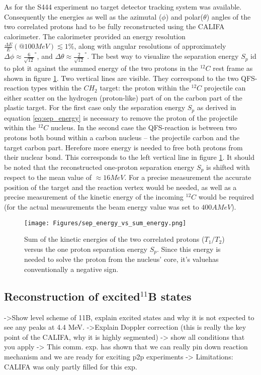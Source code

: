 As for the S444 experiment no target detector tracking system was available. Consequently the energies as well as the azimutal ($\phi$) and polar($\theta$) angles of the two correlated protons had to be fully reconstructed using the CALIFA calorimeter. The calorimeter provided an energy resolution $\frac{\Delta E}{E}(@100MeV) \lesssim 1 \%$, along with angular resolutions of approximately  $\Delta \phi \approx \frac{6}{\sqrt{12}}^{\circ}$, and $\Delta \theta \approx \frac{2}{\sqrt{12}}^{\circ}$.
The best way to visualize the separation energy $S_p$ id to plot it against the summed energy of the two protons in the $^{12}C$ rest frame as shown in figure \ref{fig:sep_energy}. Two vertical lines are visible. They correspond to the two QFS-reaction types within the $CH_2$ target: the proton within the $^{12}C$ projectile can either scatter on the hydrogen (proton-like) part of on the carbon part of the plastic target. For the first case only the separation energy $S_p$ as derived in equation \ref{eq:sep_energy} is necessary to remove the proton of the projectile within the $^{12}C$ nucleus. In the second case the QFS-reaction is between two protons both bound within a carbon nucleus -- the projectile carbon and the target carbon part. Herefore more energy is needed to free both protons from their nuclear bond. This corresponds to the left vertical line in figure \ref{fig:sep_energy}. It should be noted that the reconstructed one-proton separation energy $S_p$ is shifted with respect to the mean value of $\approx 16 MeV$. For a precise measurement the accurate position of the target and the reaction vertex would be needed, as well as a precise measurement of the kinetic energy of the incoming $^{12}C$ would be required (for the actual measurements the beam energy value was set to $400 AMeV$). 
\begin{figure}[htpb]
    \centering
    \texttt{[image: Figures/sep\_energy\_vs\_sum\_energy.png]}
    \caption{
	Sum of the kinetic energies of the two correlated protons ($T_1/T_2$) versus the one proton separation energy $S_p$. Since this energy is needed to solve the proton from the nucleus' core, it's valuehas conventionally a negative sign.  	 
    }
    \label{fig:sep_energy}
\end{figure}

\subsection{Reconstruction of excited$ ^{11}$B states}
->Show level scheme of 11B, explain excited states and why it is not expected to see any peaks at 4.4 MeV.
->Explain Doppler correction (this is really the key point of the CALIFA, why it is highly segmented)
-> show all conditions that you apply
-> This comm. exp. has shown that we can really pin down reaction mechanism and we are ready for exciting p2p experiments
-> Limitations: CALIFA was only partly filled for this exp. 
